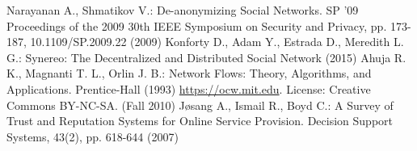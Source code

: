 \begin{thebibliography}{40}
  Narayanan A., Shmatikov V.: De-anonymizing Social Networks. SP '09 Proceedings of the 2009 30th IEEE Symposium on
  Security and Privacy, pp. 173-187, 10.1109/SP.2009.22 (2009)
  Konforty D., Adam Y., Estrada D., Meredith L. G.: Synereo: The Decentralized and Distributed Social Network (2015)
  Ahuja R. K., Magnanti T. L., Orlin J. B.: Network Flows: Theory, Algorithms, and Applications. Prentice-Hall (1993)
  \url{https://ocw.mit.edu}. License: Creative Commons BY-NC-SA. (Fall 2010)
  J\o{}sang A., Ismail R., Boyd C.: A Survey of Trust and Reputation Systems for Online Service Provision. Decision
  Support Systems, 43(2), pp. 618-644 (2007)
\end{thebibliography}

